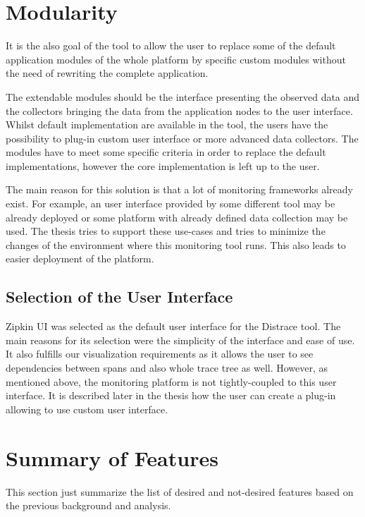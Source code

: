 \section{Modularity}
It is the also goal of the tool to allow the user to replace some of the default application modules of the whole platform by specific custom modules without the need of rewriting the complete application.

The extendable modules should be the interface presenting the observed data and the collectors bringing the data from the application nodes to the user interface. Whilst default implementation are available in the tool, the users have the possibility to plug-in custom user interface or more advanced data collectors. The modules have to meet some specific criteria in order to replace the default implementations, however the core implementation is left up to the user. 

The main reason for this solution is that a lot of monitoring frameworks already exist. For example, an user interface provided by some different tool may be already deployed or some platform with already defined data collection may be used. The thesis tries to support these use-cases and tries to minimize the changes of the environment where this monitoring tool runs. This also leads to easier deployment of the platform. 

\subsection{Selection of the User Interface}
Zipkin UI was selected as the default user interface for the Distrace tool. The main reasons for its selection were the simplicity of the interface and ease of use. It also fulfills our visualization requirements as it allows the user to see dependencies between spans and also whole trace tree as well. However, as mentioned above, the monitoring platform is not tightly-coupled to this user interface. It is described later in the thesis how the user can create a plug-in allowing to use custom user interface.

\section{Summary of Features}
This section just summarize the list of desired and not-desired features based on the previous background and analysis.

